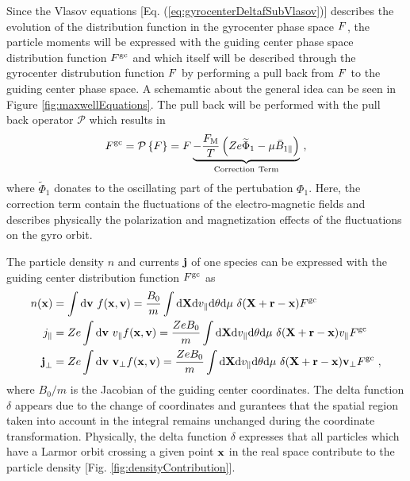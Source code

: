 Since the Vlasov equations [Eq. (\ref{eq:gyrocenterDeltafSubVlasov})] describes the evolution of the distribution function in the gyrocenter phase space $F$, the particle moments will be expressed with the guiding center phase space distribution function $F^\mathrm{gc}$ and which itself will be described through the gyrocenter distrubution function $F$ by performing a pull back from $F$ to the guiding center phase space. A schemamtic about the general idea can be seen in Figure \ref{fig:maxwellEquations}. The pull back will be performed with the pull back operator $\mathcal{P}$ which results in
\begin{gather}
	F^\mathrm{gc} = \mathcal{P} \left\{ F \right\} = F \underbrace{- \frac{F_\mathrm{M}}{T}\left(Ze \widetilde{\Phi}_1 - \mu \bar{B}_{1\parallel}\right)}_{\mathrm{Correction~Term}}~,
	\label{eq:pullback}
\end{gather}
where $\widetilde{\Phi}_1$ donates to the oscillating part of the pertubation $\Phi_1$. Here, the correction term contain the fluctuations of the electro-magnetic fields and describes physically the polarization and magnetization effects of the fluctuations on the gyro orbit. \cite{Brizard2007}
 

The particle density $n$ and currents $\boldsymbol{\mathbf{j}}$ of one species can be expressed with the guiding center distribution function $F^\mathrm{gc}$ as
\begin{gather}
	\begin{aligned}
		n(\boldsymbol{\mathbf{x}}) &= \int \mathrm{d}\boldsymbol{\mathbf{v}} ~ f(\boldsymbol{\mathbf{x}}, \boldsymbol{\mathbf{v}}) = \frac{B_0}{m} \int \mathrm{d}\boldsymbol{\mathbf{X}}\mathrm{d}v_\parallel\mathrm{d}\theta\mathrm{d}\mu ~ \delta(\boldsymbol{\mathbf{X}} + \boldsymbol{\mathbf{r}} - \boldsymbol{\mathbf{x}}) F^\mathrm{gc} \\
		j_\parallel &= Ze \int \mathrm{d}\boldsymbol{\mathbf{v}} ~ v_\parallel f(\boldsymbol{\mathbf{x}}, \boldsymbol{\mathbf{v}})= \frac{Ze B_0}{m} \int \mathrm{d}\boldsymbol{\mathbf{X}}\mathrm{d}v_\parallel\mathrm{d}\theta\mathrm{d}\mu ~ \delta(\boldsymbol{\mathbf{X}} + \boldsymbol{\mathbf{r}} - \boldsymbol{\mathbf{x}}) v_\parallel F^\mathrm{gc} \\
		\boldsymbol{\mathbf{j}}_\perp &= Ze \int \mathrm{d}\boldsymbol{\mathbf{v}} ~ \boldsymbol{\mathbf{v}}_\perp f(\boldsymbol{\mathbf{x}}, \boldsymbol{\mathbf{v}}) = \frac{Ze B_0}{m} \int \mathrm{d}\boldsymbol{\mathbf{X}}\mathrm{d}v_\parallel\mathrm{d}\theta\mathrm{d}\mu ~ \delta(\boldsymbol{\mathbf{X}} + \boldsymbol{\mathbf{r}} - \boldsymbol{\mathbf{x}}) \boldsymbol{\mathbf{v}}_\perp F^\mathrm{gc} ~,
	\end{aligned}
	\label{eq:momentsGuidingCenter}
\end{gather}
where $B_0/m$ is the Jacobian of the guiding center coordinates. The delta function $\delta$ appears due to the change of coordinates and gurantees that the spatial region taken into account in the integral remains unchanged during the coordinate transformation. Physically, the delta function $\delta$ expresses that all particles which have a Larmor orbit crossing a given point $\boldsymbol{\mathbf{x}}$ in the real space contribute to the particle density [Fig. \ref{fig:densityContribution}]. 


